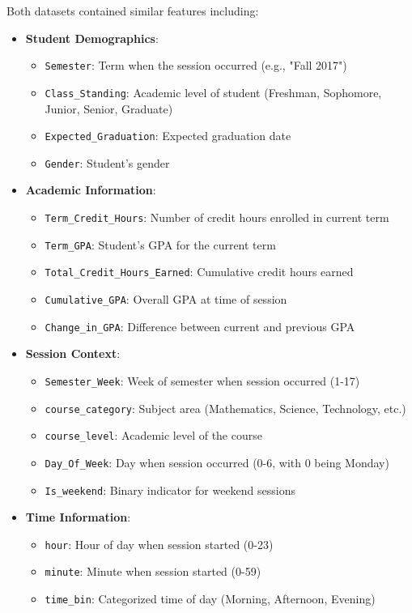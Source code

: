 \documentclass[12pt,letterpaper]{article}
\begin{document}
Both datasets contained similar features including:

\begin{itemize}
    \item \textbf{Student Demographics}:
    \begin{itemize}
        \item \texttt{Semester}: Term when the session occurred (e.g., "Fall 2017")
        \item \texttt{Class\_Standing}: Academic level of student (Freshman, Sophomore, Junior, Senior, Graduate)
        \item \texttt{Expected\_Graduation}: Expected graduation date
        \item \texttt{Gender}: Student's gender
    \end{itemize}

    \item \textbf{Academic Information}:
    \begin{itemize}
        \item \texttt{Term\_Credit\_Hours}: Number of credit hours enrolled in current term
        \item \texttt{Term\_GPA}: Student's GPA for the current term
        \item \texttt{Total\_Credit\_Hours\_Earned}: Cumulative credit hours earned
        \item \texttt{Cumulative\_GPA}: Overall GPA at time of session
        \item \texttt{Change\_in\_GPA}: Difference between current and previous GPA
    \end{itemize}

    \item \textbf{Session Context}:
    \begin{itemize}
        \item \texttt{Semester\_Week}: Week of semester when session occurred (1-17)
        \item \texttt{course\_category}: Subject area (Mathematics, Science, Technology, etc.)
        \item \texttt{course\_level}: Academic level of the course
        \item \texttt{Day\_Of\_Week}: Day when session occurred (0-6, with 0 being Monday)
        \item \texttt{Is\_weekend}: Binary indicator for weekend sessions
    \end{itemize}

    \item \textbf{Time Information}:
    \begin{itemize}
        \item \texttt{hour}: Hour of day when session started (0-23)
        \item \texttt{minute}: Minute when session started (0-59)
        \item \texttt{time\_bin}: Categorized time of day (Morning, Afternoon, Evening)
    \end{itemize}


\end{itemize}
\end{document}
